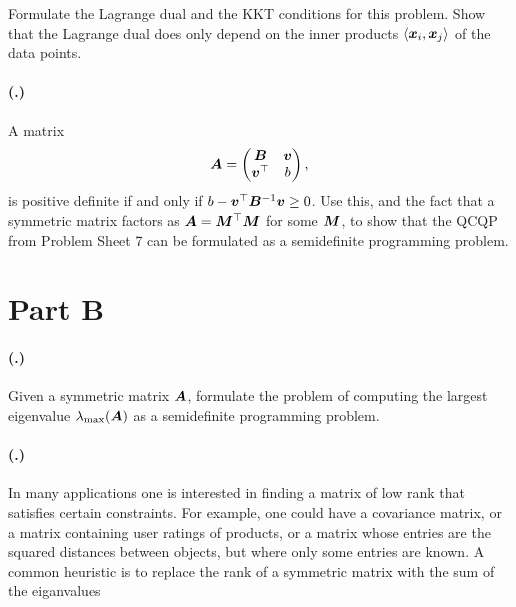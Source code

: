 \documentclass{article}
\newcounter{problemSheetNumber}
\newcounter{problems}
\renewcommand{\problem}{\paragraph{(\theproblemSheetNumber.\theproblems)}\addtocounter{problems}{1}}
\begin{document}
Formulate the Lagrange dual and the KKT conditions for this problem. Show that the Lagrange dual does only depend on the inner products $\langle {\bm{x}_i}, {\bm{x}_j} \rangle$ of the data points.

\problem A matrix
\begin{equation*}
 \bm{A} = \begin{pmatrix}
            \bm{B} & \bm{v}\\
            \bm{v}^{\top} & b
           \end{pmatrix},
\end{equation*}
is positive definite if and only if $b-\bm{v}^{\top}\bm{B}^{-1}\bm{v}\geq 0$.
Use this, and the fact that a symmetric matrix factors as $\bm{A}=\bm{M}^{\top}\bm{M}$ for some $\bm{M}$, to show that the QCQP from Problem Sheet 7 can be formulated as a semidefinite programming problem. 

\newpage
 \section*{Part B}

\problem Given a symmetric matrix $\bm{A}$, formulate the problem of computing the largest eigenvalue $\lambda_{\mathrm{max}}(\bm{A})$ as a semidefinite programming problem.



\problem In many applications one is interested in finding a matrix of low rank that satisfies certain constraints. For example, one could have a covariance matrix, or a matrix containing user ratings of products, or a matrix whose entries are the squared distances between objects, but where only some entries are known. A common heuristic is to replace the rank of a symmetric matrix with the sum of the eiganvalues
\end{document}
